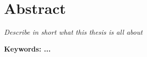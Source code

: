 
\chapter*{Abstract}
\textit{Describe in short what this thesis is all about}


\textbf{Keywords: ...}
